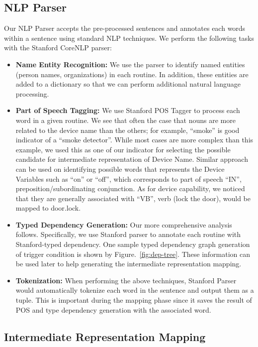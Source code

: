 \subsection{NLP Parser}
Our NLP Parser accepts the pre-processed sentences and annotates each words within a sentence using standard NLP techniques. We perform the following tasks with the Stanford CoreNLP parser:
\begin{itemize}
    \item \textbf{Name Entity Recognition: } We use the parser to identify named entities (\eg person names, organizations) in each routine. In addition, these entities are added to a dictionary so that we can perform additional natural language processing.
    \item \textbf{Part of Speech Tagging: }  We use Stanford POS Tagger to process each word in a given routine. We see that often the case that nouns are more related to the device name than the others; for example, ``smoke'' is good indicator of a ``smoke detector''.  While most cases are more complex than this example, we used this as one of our indicator for selecting the possible candidate for intermediate representation of Device Name. Similar approach can be used on identifying possible words that represents the Device Variables such as ``on'' or ``off'', which corresponds to part of speech ``IN'', preposition/subordinating conjunction. As for device capability, we noticed that they are generally associated with ``VB'', verb (\eg lock the door), would be mapped to door.lock.
    \item \textbf{Typed Dependency Generation: } Our more comprehensive analysis follows. Specifically, we use Stanford parser to annotate each routine with Stanford-typed dependency. One sample typed dependency graph generation of trigger condition is shown by Figure.~\ref{fig:dep-tree}. These information can be used later to help generating the intermediate representation mapping.
    \item \textbf{Tokenization: } When performing the above techniques, Stanford Parser would automatically tokenize each word in the sentence and output them as a tuple. This is important during the mapping phase since it saves the result of POS and type dependency generation with the associated word.
\end{itemize}

\subsection{Intermediate Representation Mapping}

